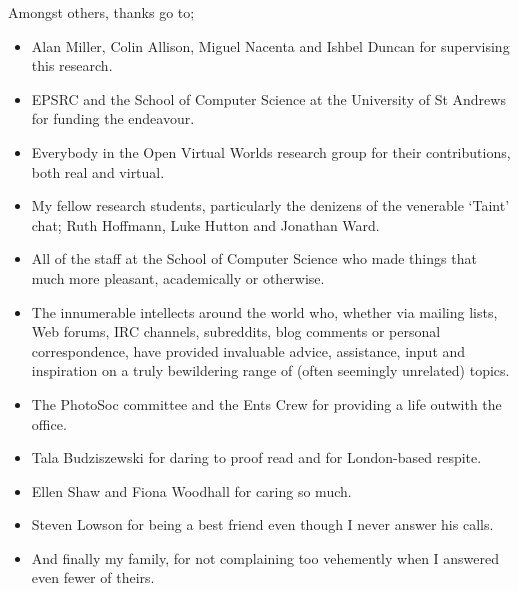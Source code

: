 Amongst others, thanks go to;

\begin{itemize}

	\item Alan Miller, Colin Allison, Miguel Nacenta and Ishbel Duncan for supervising this research.
	
	\item EPSRC and the School of Computer Science at the University of St Andrews for funding the endeavour.
	
	\item Everybody in the Open Virtual Worlds research group for their contributions, both real and virtual.
	
	\item My fellow research students, particularly the denizens of the venerable `Taint' chat; Ruth Hoffmann, Luke Hutton and Jonathan Ward.
	
	\item All of the staff at the School of Computer Science who made things that much more pleasant, academically or otherwise.
	
	\item The innumerable intellects around the world who, whether via mailing lists, Web forums, IRC channels, subreddits, blog comments or personal correspondence, have provided invaluable advice, assistance, input and inspiration on a truly bewildering range of (often seemingly unrelated) topics.
	
	\item The PhotoSoc committee and the Ents Crew for providing a life outwith the office.
	
	\item Tala Budziszewski for daring to proof read and for London-based respite.
	
	\item Ellen Shaw and Fiona Woodhall for caring so much.
	
	\item Steven Lowson for being a best friend even though I never answer his calls.
	
	\item And finally my family, for not complaining too vehemently when I answered even fewer of theirs.

\end{itemize}